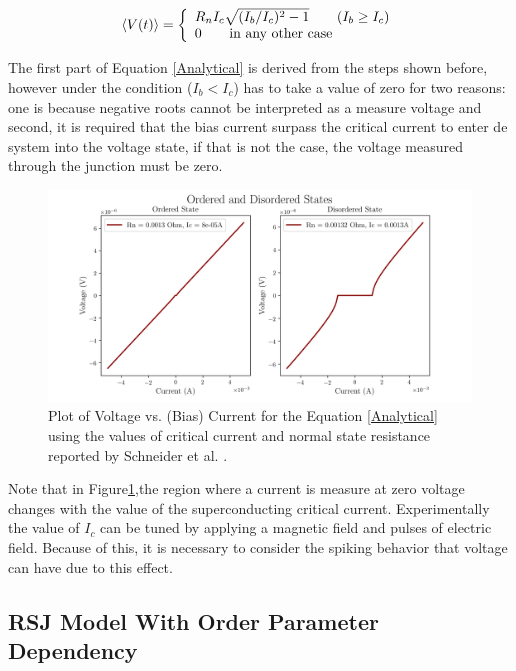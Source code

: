 \documentclass[12pt]{article}
\begin{document}
\begin{equation}
\langle V(t)\rangle = \left\{ \begin{array}{lcc}
             R_{n}I_{c} \sqrt{(I_{b}/I_{c})^{2}-1} \qquad (I_{b} \geq I_{c})
             \\ 0  \qquad $in any other case$\\
             \end{array}
   \right.
\end{equation}
\label{Analytical}

The first part of Equation \ref{Analytical} is derived from the steps shown before, however under the condition ($I_{b}<I_{c}$) has to take a value of zero for two reasons: one is because negative roots cannot be interpreted as a measure voltage and second, it is required that the bias current surpass the critical current to enter de system into the voltage state, if that is not the case, the voltage measured through the junction must be zero.

\begin{figure}[ht]
    \centering
    \includegraphics[scale=0.65]{AN_OrderDisorder.png}
    \caption{Plot of Voltage vs. (Bias) Current for the Equation \ref{Analytical} using the values of critical current and normal state resistance reported by Schneider et al. \cite{MAINREF}.}
    \label{AnORDIS}
\end{figure}

Note that in Figure\ref{AnORDIS},the region where a current is measure at zero voltage changes with the value of the superconducting critical current. Experimentally the value of $I_{c}$ can be tuned by applying a magnetic field and pulses of electric field. Because of this, it is necessary to consider the spiking behavior that voltage can have due to this effect.

\subsection{RSJ Model With Order Parameter Dependency}
\end{document}
